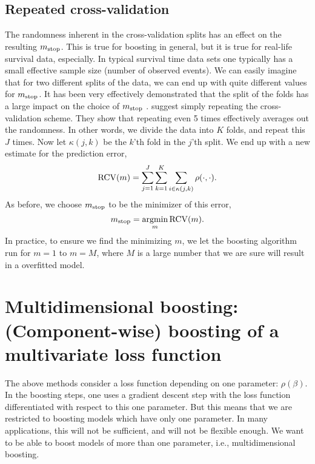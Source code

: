\subsection{Repeated cross-validation}
The randomness inherent in the cross-validation splits has an effect on the resulting $m_{\text{stop}}$. This is true for boosting in general, but it is true for real-life survival data, especially. In typical survival time data sets one typically has a small effective sample size (number of observed events). We can easily imagine that for two different splits of the data, we can end up with quite different values for $m_{\text{stop}}$.
It has been very effectively demonstrated that the split of the folds has a large impact on the choice of $m_{\text{stop}}$ \citep{seibold}. \citet{seibold} suggest simply repeating the cross-validation scheme. They show that repeating even 5 times effectively averages out the randomness.  In other words, we divide the data into $K$ folds, and repeat this $J$ times. Now let $\kappa(j, k)$ be the $k$'th fold in the $j$'th split. We end up with a new estimate for the prediction error,
\begin{equation}
    \operatorname{RCV}(m)=\sum_{j=1}^J\sum_{k=1}^K\sum_{i\in\kappa(j,k)}\rho(\cdot,\cdot).
\end{equation}
As before, we choose $m_{\text{stop}}$ to be the minimizer of this error,
\begin{equation}
    m_{\text{stop}}=\operatorname*{argmin}_{m}\operatorname{RCV}(m).
\end{equation}
In practice, to ensure we find the minimizing $m$, we let the boosting algorithm run for $m=1$ to $m=M$, where $M$ is a large number that we are sure will result in a overfitted model.

\section{Multidimensional boosting: (Component-wise) boosting of a multivariate loss function}
The above methods consider a loss function depending on one parameter: $\rho(\beta)$. In the boosting steps, one uses a gradient descent step with the loss function differentiated with respect to this one parameter. But this means that we are restricted to boosting models which have only one parameter. In many applications, this will not be sufficient, and will not be flexible enough. We want to be able to boost models of more than one parameter, i.e., multidimensional boosting.


